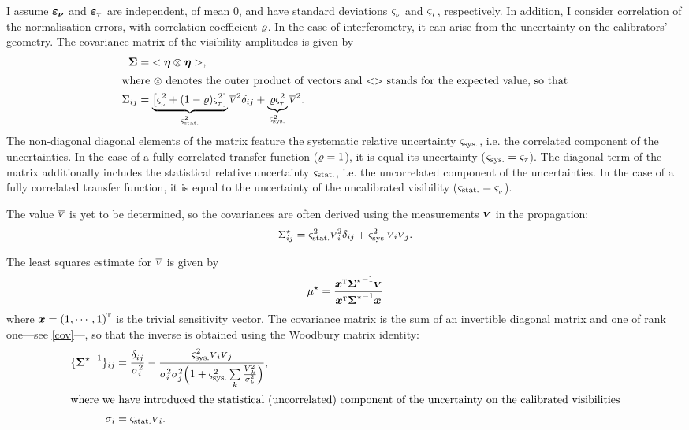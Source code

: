 \documentclass{pasa}
\begin{document}
I assume $\boldsymbol{\varepsilon_\nu}$ and $\boldsymbol{\varepsilon_\tau}$ are independent, of mean 0, and have standard deviations $\varsigma_{_\nu}$ and $\varsigma_\tau$, respectively. In addition, I consider correlation of the normalisation errors, with correlation coefficient $\varrho$.  In the case of interferometry, it can arise from the uncertainty on the calibrators' geometry.  The covariance matrix of the visibility amplitudes is given by
\begin{align}
    \boldsymbol{\Sigma}     &=  {<\boldsymbol{\eta}\otimes\boldsymbol{\eta}>} ,\\
\intertext{where $\otimes$ denotes the outer product of vectors and $ {<>} $ stands for the expected value, so that}
    \Sigma_{ij} &= \underbrace{\left[ \varsigma_{_\nu}^2 
                  + (1-\varrho)\varsigma_\tau^2 \right]}_{\varsigma_\text{stat.}^2} \overline{{\scriptstyle V}}^2
                \delta_{ij} 
            + \underbrace{\varrho\varsigma_\tau^2}_{\varsigma_\text{sys.}^2} \overline{{\scriptstyle V}}^2.
\end{align}
The non-diagonal diagonal elements of the matrix feature the systematic
relative uncertainty $\varsigma_\text{sys.}$, i.e. the correlated component of the
uncertainties.  In the case of a fully correlated transfer function ($\varrho =
1$), it is equal its uncertainty ($\varsigma_\text{sys.} = \varsigma_\tau$). The diagonal term of
the matrix additionally includes the statistical relative uncertainty
$\varsigma_\text{stat.}$, i.e. the uncorrelated component of the uncertainties.  In the case
of a fully correlated transfer function, it is equal to the uncertainty of the
uncalibrated visibility ($\varsigma_\text{stat.} = \varsigma_{_\nu}$).


The value $\overline{{\scriptstyle V}}$ is yet to be determined, so the covariances are often derived using the measurements $\boldsymbol{{\scriptstyle V}}$ in the propagation:
\begin{equation}
    \Sigma_{ij}^\star = \varsigma_\text{stat.}^2 {\scriptstyle V}_i^2 \delta_{ij} 
            + \varsigma_\text{sys.}^2{\scriptstyle V}_i{\scriptstyle V}_j. \label{eq:cov}
\end{equation}

The least squares estimate for $\overline{{\scriptstyle V}}$ is given by
\begin{equation}
    \mu^\star =
                  \frac { {\boldsymbol{x}}^\text{\textsc{t}}{\ensuremath{\boldsymbol{\Sigma}}^\star}^{-1}\boldsymbol{{\scriptstyle V}} }
                        { {\boldsymbol{x}}^\text{\textsc{t}}{\ensuremath{\boldsymbol{\Sigma}}^\star}^{-1}\boldsymbol{x} }
    \label{eq:pppmod}
\end{equation}
where $\boldsymbol{x} = {(1, \cdots, 1)}^\text{\textsc{t}}$ is the trivial sensitivity vector.  The covariance matrix is the sum of an invertible diagonal matrix and one of rank one---see \eqref{cov}---, so that the inverse is obtained using the Woodbury matrix identity: 
\begin{align}
    \{ {\boldsymbol{\Sigma}^\star}^{-1} \}_{ij} &= \frac{\delta_{ij}}{\sigma_i^2}
         - \frac{\varsigma_\text{sys.}^2{\scriptstyle V}_i{\scriptstyle V}_j}
                {\sigma_i^2\sigma_j^2\Big(1 + 
            \varsigma_\text{sys.}^2\sum\limits_{k} \frac{{\scriptstyle V}_k^2}{\sigma_k^2}\Big)},
            \label{eq:invcov}\\
  \intertext{where we have introduced the statistical (uncorrelated) component of the uncertainty on the calibrated visibilities}
  \sigma_i     &= \varsigma_\text{stat.}{\scriptstyle V}_i \label{eq:devi}.
\end{align}
\end{document}
